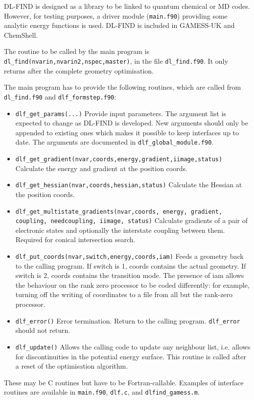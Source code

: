 \documentclass{article}
\begin{document}
DL-FIND is designed as a library to be linked to quantum chemical or MD codes.
However, for testing purposes, a driver module (\texttt{main.f90}) providing some
analytic energy functions is used. DL-FIND is included in GAMESS-UK and
ChemShell.

The routine to be called by the main program is
\texttt{dl\_find(nvarin,nvarin2,nspec,master)}, in the file \texttt{dl\_find.f90}. It
only returns after the complete geometry optimisation.

The main program has to provide the following routines, which are called from
\texttt{dl\_find.f90} and \texttt{dlf\_formstep.f90}:
\begin{itemize}
\item \texttt{dlf\_get\_params(...)} Provide input parameters. The argument
  list is expected to change as DL-FIND is developed. New arguments should
  only be appended to existing ones which makes it possible to keep interfaces
  up to date. The arguments are documented in \texttt{dlf\_global\_module.f90}.
\item \texttt{dlf\_get\_gradient(nvar,coords,energy,gradient,iimage,status)}
  Calculate the energy and gradient at the position coords.
\item \texttt{dlf\_get\_hessian(nvar,coords,hessian,status)} Calculate the
  Hessian at the position coords.
\item \texttt{dlf\_get\_multistate\_gradients(nvar,coords, energy, gradient,
    coupling, needcoupling, iimage, status)} Calculate gradients of a pair of electronic states 
and optionally the interstate coupling between them. Required for conical
    intersection search.
\item \texttt{dlf\_put\_coords(nvar,switch,energy,coords,iam)} Feeds a geometry
  back to the calling program. If switch is 1, coords contains the actual
  geometry. If switch is 2, coords contains the transition mode.
  The presence of iam allows the behaviour on the rank zero processor to be coded 
  differently: for 
  example, turning off the writing of coordinates to a file from all but the
  rank-zero processor.
\item \texttt{dlf\_error()} Error termination. Return to the calling
  program. \texttt{dlf\_error} should not return.
\item \texttt{dlf\_update()} Allows the calling code to update any neighbour
  list, i.e. allows for discontinuities in the potential energy surface. This
  routine is called after a reset of the optimisation algorithm.
\end{itemize}
These may be C routines but have to be Fortran-callable. Examples of interface
routines are available in \texttt{main.f90}, \texttt{dlf.c}, and
\texttt{dlfind\_gamess.m}.
\end{document}
